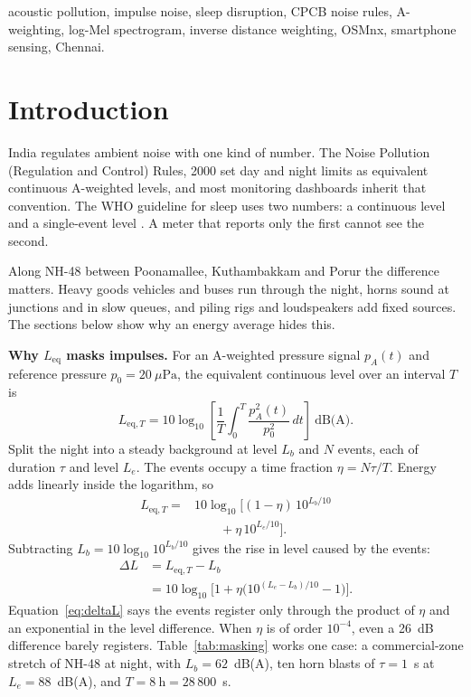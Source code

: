 \documentclass[conference]{IEEEtran}
\newcommand{\Leq}{L_{\text{eq}}}
\begin{document}
\begin{IEEEkeywords}
acoustic pollution, impulse noise, sleep disruption, CPCB noise rules, A-weighting, log-Mel spectrogram, inverse distance weighting, OSMnx, smartphone sensing, Chennai.
\end{IEEEkeywords}

\section{Introduction}

India regulates ambient noise with one kind of number. The Noise Pollution (Regulation and Control) Rules, 2000 \cite{cpcb2000} set day and night limits as equivalent continuous A-weighted levels, and most monitoring dashboards inherit that convention. The WHO guideline for sleep uses two numbers: a continuous level and a single-event level \cite{who1999}. A meter that reports only the first cannot see the second.

Along NH-48 between Poonamallee, Kuthambakkam and Porur the difference matters. Heavy goods vehicles and buses run through the night, horns sound at junctions and in slow queues, and piling rigs and loudspeakers add fixed sources. The sections below show why an energy average hides this.

\textbf{Why $\Leq$ masks impulses.} For an A-weighted pressure signal $p_A(t)$ and reference pressure $p_0 = 20~\mu\text{Pa}$, the equivalent continuous level over an interval $T$ is
\begin{equation}
L_{\text{eq},T}=10\log_{10}\!\left[\frac{1}{T}\int_0^{T}\frac{p_A^{2}(t)}{p_0^{2}}\,dt\right]\ \text{dB(A)}.
\label{eq:leq}
\end{equation}
Split the night into a steady background at level $L_b$ and $N$ events, each of duration $\tau$ and level $L_e$. The events occupy a time fraction $\eta = N\tau/T$. Energy adds linearly inside the logarithm, so
\begin{equation}
\begin{split}
L_{\text{eq},T}={}&10\log_{10}\!\Big[(1-\eta)\,10^{L_b/10}\\
&\qquad+\eta\,10^{L_e/10}\Big].
\end{split}
\label{eq:mix}
\end{equation}
Subtracting $L_b=10\log_{10}10^{L_b/10}$ gives the rise in level caused by the events:
\begin{equation}
\begin{split}
\Delta L &= L_{\text{eq},T}-L_b\\
&= 10\log_{10}\!\Big[1+\eta\big(10^{(L_e-L_b)/10}-1\big)\Big].
\end{split}
\label{eq:deltaL}
\end{equation}
Equation~\eqref{eq:deltaL} says the events register only through the product of $\eta$ and an exponential in the level difference. When $\eta$ is of order $10^{-4}$, even a 26~dB difference barely registers. Table~\ref{tab:masking} works one case: a commercial-zone stretch of NH-48 at night, with $L_b = 62$~dB(A), ten horn blasts of $\tau = 1$~s at $L_e = 88$~dB(A), and $T = 8~\text{h} = 28\,800$~s.
\end{document}
